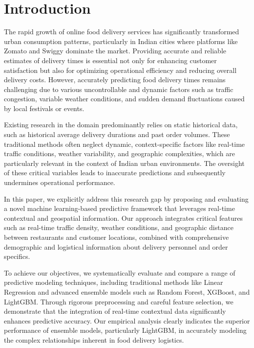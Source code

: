 \documentclass[10pt,twocolumn,letterpaper]{article}
\begin{document}
\section{Introduction}
The rapid growth of online food delivery services has significantly transformed urban consumption patterns, particularly in Indian cities where platforms like Zomato and Swiggy dominate the market. Providing accurate and reliable estimates of delivery times is essential not only for enhancing customer satisfaction but also for optimizing operational efficiency and reducing overall delivery costs. However, accurately predicting food delivery times remains challenging due to various uncontrollable and dynamic factors such as traffic congestion, variable weather conditions, and sudden demand fluctuations caused by local festivals or events.

Existing research in the domain predominantly relies on static historical data, such as historical average delivery durations and past order volumes. These traditional methods often neglect dynamic, context-specific factors like real-time traffic conditions, weather variability, and geographic complexities, which are particularly relevant in the context of Indian urban environments. The oversight of these critical variables leads to inaccurate predictions and subsequently undermines operational performance.

In this paper, we explicitly address this research gap by proposing and evaluating a novel machine learning-based predictive framework that leverages real-time contextual and geospatial information. Our approach integrates critical features such as real-time traffic density, weather conditions, and geographic distance between restaurants and customer locations, combined with comprehensive demographic and logistical information about delivery personnel and order specifics.

To achieve our objectives, we systematically evaluate and compare a range of predictive modeling techniques, including traditional methods like Linear Regression and advanced ensemble models such as Random Forest, XGBoost, and LightGBM. Through rigorous preprocessing and careful feature selection, we demonstrate that the integration of real-time contextual data significantly enhances predictive accuracy. Our empirical analysis clearly indicates the superior performance of ensemble models, particularly LightGBM, in accurately modeling the complex relationships inherent in food delivery logistics.
\end{document}
